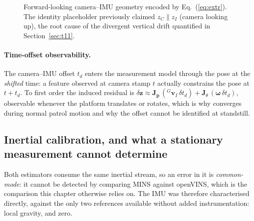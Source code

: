 \begin{figure}[htbp]
\centering
{}
\caption{Forward-looking camera--IMU geometry encoded by
Eq.~(\ref{eq:extr}). The identity placeholder previously claimed
$z_C \parallel z_I$ (camera looking up), the root cause of the divergent
vertical drift quantified in Section~\ref{sec:t11}.}
\label{fig:frames}
\end{figure}

\paragraph{Time-offset observability.} The camera--IMU offset $t_d$ enters the
measurement model through the pose at the \emph{shifted} time: a feature
observed at camera stamp $t$ actually constrains the pose at $t + t_d$. To
first order the induced residual is
$\delta\mathbf{z} \approx \mathbf{J}_{\mathbf{p}}\,
({}^{G}\mathbf{v}_{I}\,\delta t_d) + \mathbf{J}_{\theta}\,
(\boldsymbol{\omega}\,\delta t_d)$,
observable whenever the platform translates or rotates, which is why
 converges during normal patrol motion and why the
offset cannot be identified at standstill.

\subsection{Inertial calibration, and what a stationary measurement cannot
determine}
\label{sec:imucalib}
Both estimators consume the same inertial stream, so an error in it is
\emph{common-mode}: it cannot be detected by comparing MINS against openVINS,
which is the comparison this chapter otherwise relies on. The IMU was therefore
characterised directly, against the only two references available without added
instrumentation: local gravity, and zero.

